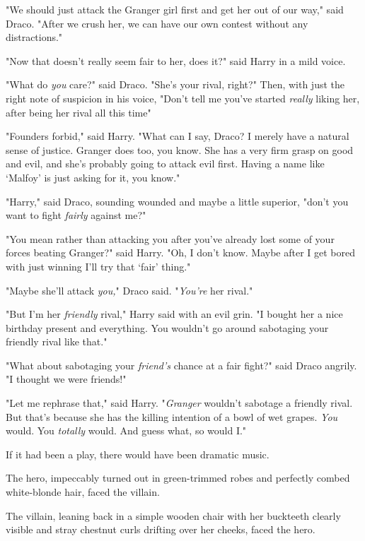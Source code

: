 "We should just attack the Granger girl first and get her out of our way," said
Draco. "After we crush her, we can have our own contest without any
distractions."

"Now that doesn't really seem fair to her, does it?" said Harry in a mild voice.

"What do \emph{you} care?" said Draco. "She's your rival, right?" Then, with
just the right note of suspicion in his voice, "Don't tell me you've started
\emph{really} liking her, after being her rival all this time{\el}"

"Founders forbid," said Harry. "What can I say, Draco? I merely have a natural
sense of justice. Granger does too, you know. She has a very firm grasp on good
and evil, and she's probably going to attack evil first. Having a name like
`Malfoy' is just asking for it, you know."

\emph{}

"Harry," said Draco, sounding wounded and maybe a little superior, "don't you
want to fight \emph{fairly} against me?"

"You mean rather than attacking you after you've already lost some of your
forces beating Granger?" said Harry. "Oh, I don't know. Maybe after I get bored
with just winning I'll try that `fair' thing."

"Maybe she'll attack \emph{you,}" Draco said. "\emph{You're} her rival."

"But I'm her \emph{friendly} rival," Harry said with an evil grin. "I bought
her a nice birthday present and everything. You wouldn't go around sabotaging
your friendly rival like that."

"What about sabotaging your \emph{friend's} chance at a fair fight?" said Draco
angrily. "I thought we were friends!"

"Let me rephrase that," said Harry. "\emph{Granger} wouldn't sabotage a
friendly rival. But that's because she has the killing intention of a bowl of
wet grapes. \emph{You} would. You \emph{totally} would. And guess what, so
would I."

\emph{}
\sbreak
If it had been a play, there would have been dramatic music.

The hero, impeccably turned out in green-trimmed robes and perfectly combed
white-blonde hair, faced the villain.

The villain, leaning back in a simple wooden chair with her buckteeth clearly
visible and stray chestnut curls drifting over her cheeks, faced the hero.

